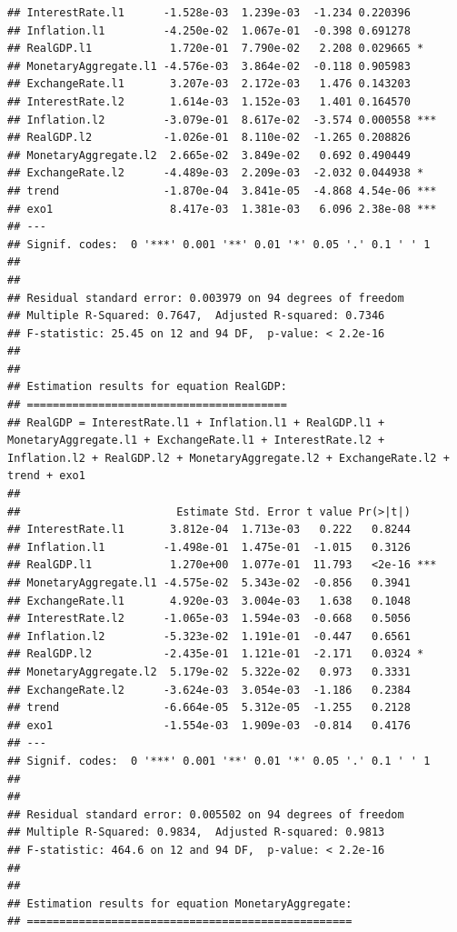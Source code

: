 \documentclass[11pt,preprint, authoryear]{elsarticle}
\numberwithin{equation}{section}
\numberwithin{figure}{section}
\numberwithin{table}{section}
\begin{document}
\begin{verbatim}
## InterestRate.l1      -1.528e-03  1.239e-03  -1.234 0.220396    
## Inflation.l1         -4.250e-02  1.067e-01  -0.398 0.691278    
## RealGDP.l1            1.720e-01  7.790e-02   2.208 0.029665 *  
## MonetaryAggregate.l1 -4.576e-03  3.864e-02  -0.118 0.905983    
## ExchangeRate.l1       3.207e-03  2.172e-03   1.476 0.143203    
## InterestRate.l2       1.614e-03  1.152e-03   1.401 0.164570    
## Inflation.l2         -3.079e-01  8.617e-02  -3.574 0.000558 ***
## RealGDP.l2           -1.026e-01  8.110e-02  -1.265 0.208826    
## MonetaryAggregate.l2  2.665e-02  3.849e-02   0.692 0.490449    
## ExchangeRate.l2      -4.489e-03  2.209e-03  -2.032 0.044938 *  
## trend                -1.870e-04  3.841e-05  -4.868 4.54e-06 ***
## exo1                  8.417e-03  1.381e-03   6.096 2.38e-08 ***
## ---
## Signif. codes:  0 '***' 0.001 '**' 0.01 '*' 0.05 '.' 0.1 ' ' 1
## 
## 
## Residual standard error: 0.003979 on 94 degrees of freedom
## Multiple R-Squared: 0.7647,  Adjusted R-squared: 0.7346 
## F-statistic: 25.45 on 12 and 94 DF,  p-value: < 2.2e-16 
## 
## 
## Estimation results for equation RealGDP: 
## ======================================== 
## RealGDP = InterestRate.l1 + Inflation.l1 + RealGDP.l1 + MonetaryAggregate.l1 + ExchangeRate.l1 + InterestRate.l2 + Inflation.l2 + RealGDP.l2 + MonetaryAggregate.l2 + ExchangeRate.l2 + trend + exo1 
## 
##                        Estimate Std. Error t value Pr(>|t|)    
## InterestRate.l1       3.812e-04  1.713e-03   0.222   0.8244    
## Inflation.l1         -1.498e-01  1.475e-01  -1.015   0.3126    
## RealGDP.l1            1.270e+00  1.077e-01  11.793   <2e-16 ***
## MonetaryAggregate.l1 -4.575e-02  5.343e-02  -0.856   0.3941    
## ExchangeRate.l1       4.920e-03  3.004e-03   1.638   0.1048    
## InterestRate.l2      -1.065e-03  1.594e-03  -0.668   0.5056    
## Inflation.l2         -5.323e-02  1.191e-01  -0.447   0.6561    
## RealGDP.l2           -2.435e-01  1.121e-01  -2.171   0.0324 *  
## MonetaryAggregate.l2  5.179e-02  5.322e-02   0.973   0.3331    
## ExchangeRate.l2      -3.624e-03  3.054e-03  -1.186   0.2384    
## trend                -6.664e-05  5.312e-05  -1.255   0.2128    
## exo1                 -1.554e-03  1.909e-03  -0.814   0.4176    
## ---
## Signif. codes:  0 '***' 0.001 '**' 0.01 '*' 0.05 '.' 0.1 ' ' 1
## 
## 
## Residual standard error: 0.005502 on 94 degrees of freedom
## Multiple R-Squared: 0.9834,  Adjusted R-squared: 0.9813 
## F-statistic: 464.6 on 12 and 94 DF,  p-value: < 2.2e-16 
## 
## 
## Estimation results for equation MonetaryAggregate: 
## ================================================== 

\end{verbatim}
\end{document}
